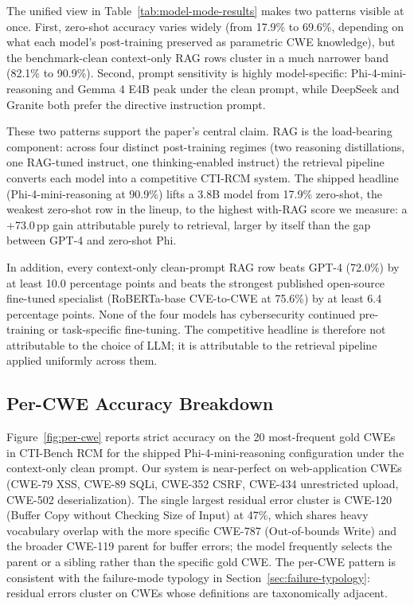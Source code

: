 The unified view in Table~\ref{tab:model-mode-results} makes two patterns visible at once. First, zero-shot accuracy varies widely (from 17.9\% to 69.6\%, depending on what each model's post-training preserved as parametric CWE knowledge), but the benchmark-clean context-only RAG rows cluster in a much narrower band (82.1\% to 90.9\%). Second, prompt sensitivity is highly model-specific: Phi-4-mini-reasoning and Gemma 4 E4B peak under the clean prompt, while DeepSeek and Granite both prefer the directive instruction prompt.

These two patterns support the paper's central claim. RAG is the load-bearing component: across four distinct post-training regimes (two reasoning distillations, one RAG-tuned instruct, one thinking-enabled instruct) the retrieval pipeline converts each model into a competitive CTI-RCM system. The shipped headline (Phi-4-mini-reasoning at 90.9\%) lifts a 3.8B model from 17.9\% zero-shot, the weakest zero-shot row in the lineup, to the highest with-RAG score we measure: a +73.0\,pp gain attributable purely to retrieval, larger by itself than the gap between GPT-4 and zero-shot Phi.

In addition, every context-only clean-prompt RAG row beats GPT-4 (72.0\%) by at least 10.0 percentage points and beats the strongest published open-source fine-tuned specialist (RoBERTa-base CVE-to-CWE at 75.6\%) by at least 6.4 percentage points. None of the four models has cybersecurity continued pre-training or task-specific fine-tuning. The competitive headline is therefore not attributable to the choice of LLM; it is attributable to the retrieval pipeline applied uniformly across them.

\subsection{Per-CWE Accuracy Breakdown}
\label{sec:per-cwe}

Figure~\ref{fig:per-cwe} reports strict accuracy on the 20 most-frequent gold CWEs in CTI-Bench RCM for the shipped Phi-4-mini-reasoning configuration under the context-only clean prompt. Our system is near-perfect on web-application CWEs (CWE-79 XSS, CWE-89 SQLi, CWE-352 CSRF, CWE-434 unrestricted upload, CWE-502 deserialization). The single largest residual error cluster is CWE-120 (Buffer Copy without Checking Size of Input) at 47\%, which shares heavy vocabulary overlap with the more specific CWE-787 (Out-of-bounds Write) and the broader CWE-119 parent for buffer errors; the model frequently selects the parent or a sibling rather than the specific gold CWE. The per-CWE pattern is consistent with the failure-mode typology in Section~\ref{sec:failure-typology}: residual errors cluster on CWEs whose definitions are taxonomically adjacent.

